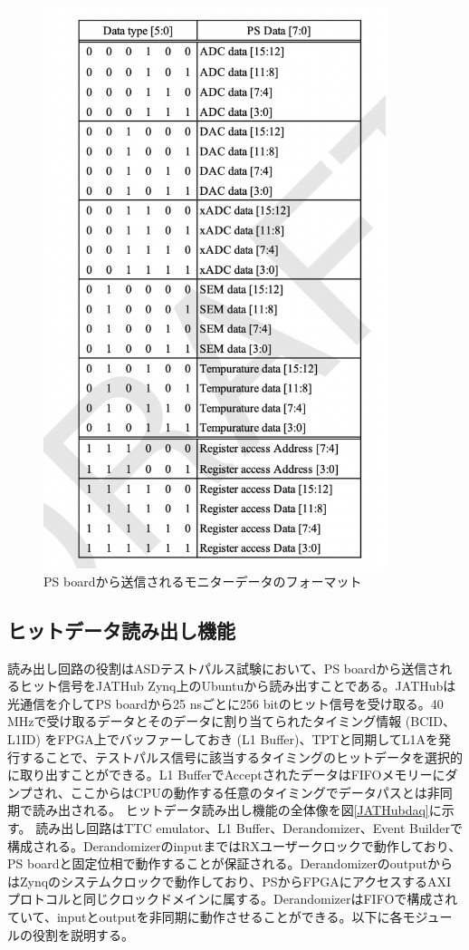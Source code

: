 \begin{figure} 
\centering
\includegraphics[width=10cm]{fig/QAQC/PSBdataformat.png}
\caption[PS boardから送信されるモニターデータのフォーマット]{PS boardから送信されるモニターデータのフォーマット}
\label{PSBdataformat}
\end{figure}

\subsection*{ヒットデータ読み出し機能}
\label{subsubsec_DAQ}
読み出し回路の役割はASDテストパルス試験において、PS boardから送信されるヒット信号をJATHub Zynq上のUbuntuから読み出すことである。JATHubは光通信を介してPS boardから25 nsごとに256 bitのヒット信号を受け取る。40 MHzで受け取るデータとそのデータに割り当てられたタイミング情報 (BCID、L1ID) をFPGA上でバッファーしておき (L1 Buffer)、TPTと同期してL1Aを発行することで、テストパルス信号に該当するタイミングのヒットデータを選択的に取り出すことができる。L1 BufferでAcceptされたデータはFIFOメモリーにダンプされ、ここからはCPUの動作する任意のタイミングでデータパスとは非同期で読み出される。
ヒットデータ読み出し機能の全体像を図\ref{JATHubdaq}に示す。
読み出し回路はTTC emulator、L1 Buffer、Derandomizer、Event Builderで構成される。DerandomizerのinputまではRXユーザークロックで動作しており、PS boardと固定位相で動作することが保証される。DerandomizerのoutputからはZynqのシステムクロックで動作しており、PSからFPGAにアクセスするAXIプロトコルと同じクロックドメインに属する。DerandomizerはFIFOで構成されていて、inputとoutputを非同期に動作させることができる。以下に各モジュールの役割を説明する。

